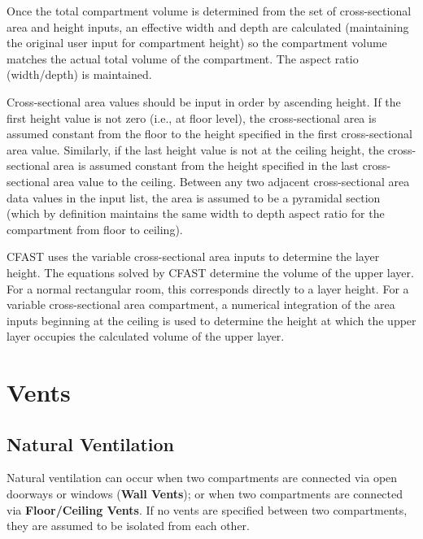 Once the total compartment volume is determined from the set of cross-sectional area and height inputs, an effective width and depth are calculated (maintaining the original user input for compartment height) so the compartment volume matches the actual total volume of the compartment. The aspect ratio (width/depth) is maintained.

Cross-sectional area values should be input in order by ascending height. If the first height value is not zero (i.e., at floor level), the cross-sectional area is assumed constant from the floor to the height specified in the first cross-sectional area value.
Similarly, if the last height value is not at the ceiling height, the cross-sectional area is assumed constant from the height specified in the last cross-sectional area value to the ceiling. Between any two adjacent cross-sectional area data values in the input list, the area is assumed to be a pyramidal section (which by definition maintains the same width to depth aspect ratio for the compartment from floor to ceiling).

CFAST uses the variable cross-sectional area inputs to determine the layer height. The equations solved by CFAST determine the volume of the upper layer. For a normal rectangular room, this corresponds directly to a layer height. For a variable cross-sectional area compartment, a numerical integration of the area inputs beginning at the ceiling is used to determine the height at which the upper layer occupies the calculated volume of the upper layer.





\chapter{Vents}
\section{Natural Ventilation}

Natural ventilation can occur when two compartments are connected via open doorways or windows (\textbf{Wall Vents}); or when two compartments are connected via \textbf{Floor/Ceiling Vents}. If no vents are specified between two compartments, they are assumed to be isolated from each other.


